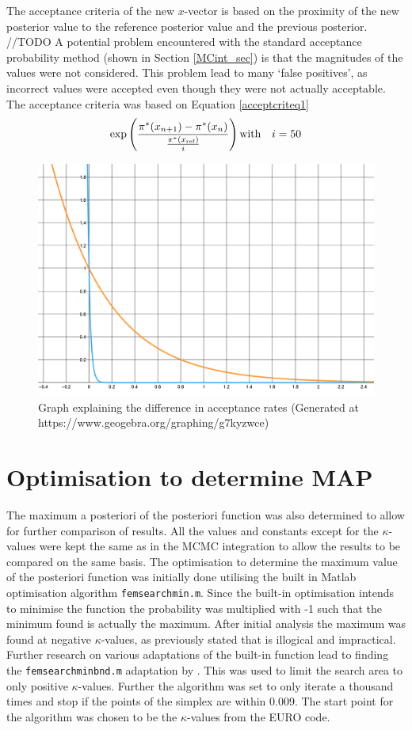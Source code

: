 %	
	
	The acceptance criteria of the new $x$-vector is based on the proximity of the new posterior value to the reference posterior value and the previous posterior. //TODO
	A potential problem encountered with the standard acceptance probability method (shown in Section \ref{MCint_sec}) is that the magnitudes of the values were not considered. 
	This problem lead to many `false positives', as incorrect values were accepted even though they were not actually acceptable. 
	The acceptance criteria was based on Equation \ref{acceptcriteq1}
	\begin{equation}\label{acceptcriteq1}
	\exp\left(\frac {\pi^*(x_{n+1})-\pi^*(x_n)}{\frac{\pi^*(x_{\text{ref}})}{i}}\right)\\
	\text{with} \quad i = 50\\
	\end{equation}
	
	\begin{figure}[H]
	\centering
	\includegraphics[width = 0.5\linewidth]{figures/e_expl_curve.png}
	\caption{Graph explaining the difference in acceptance rates (Generated at https://www.geogebra.org/graphing/g7kyzwce)}
	\end{figure}
	 
	
	
	\section{Optimisation to determine MAP}
The maximum a posteriori of the posteriori function was also determined to allow for further comparison of results.
All the values and constants except for the $\kappa$-values were kept the same as in the MCMC integration to allow the results to be compared on the same basis.  
	The optimisation to determine the maximum value of the posteriori function was initially done utilising the built in Matlab optimisation algorithm \texttt{femsearchmin.m}. 
	Since the built-in optimisation intends to minimise the function the probability was multiplied with -1 such that the minimum found is actually the maximum.
	After initial analysis the maximum was found at negative $\kappa$-values, as previously stated that is illogical and impractical.
	Further research on various adaptations of the built-in function lead to finding the \texttt{femsearchminbnd.m} adaptation by \citet{derrico:2021}. 
	This was used to limit the search area to only positive $\kappa$-values.
	Further the algorithm was set to only iterate a thousand times and stop if the points of the simplex are within 0.009.
	The start point for the algorithm was chosen to be the $\kappa$-values from the EURO code.
	
	
	
	
